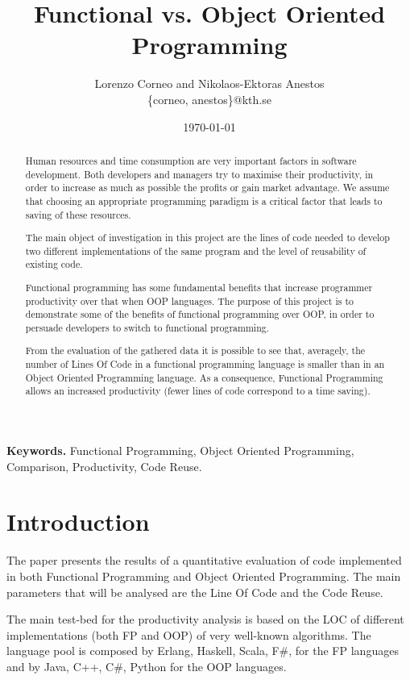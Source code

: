 \documentclass{article}
\begin{document}
\title{Functional vs. Object Oriented Programming}
\author{Lorenzo Corneo and Nikolaos-Ektoras Anestos \\
	\{corneo, anestos\}@kth.se}
\date{\today}
\maketitle

\begin{abstract}
Human resources and time consumption are very important factors in software development. Both developers and managers try to maximise their productivity, in order to increase as much as possible the profits or gain market advantage. We assume that choosing an appropriate programming paradigm is a critical factor that leads to saving of these resources.

The main object of investigation in this project are the lines of code needed to develop two different implementations of the same program and the level of reusability of existing code.

Functional programming has some fundamental benefits that increase programmer productivity over that when OOP languages. The purpose of this project is to demonstrate some of the benefits of functional programming over OOP, in order to persuade developers to switch to functional programming.

From the evaluation of the gathered data it is possible to see that, averagely, the number of Lines Of Code in a functional programming language is smaller than in an Object Oriented Programming language. As a consequence, Functional Programming allows an increased productivity (fewer lines of code correspond to a time saving).
\end{abstract}

\smallskip
\noindent \textbf{Keywords.} Functional Programming, Object Oriented Programming, Comparison, Productivity, Code Reuse.

\section{Introduction}

The paper presents the results of a quantitative evaluation of code implemented in both Functional Programming and Object Oriented Programming. The main parameters that will be analysed are the Line Of Code and the Code Reuse.

The main test-bed for the productivity analysis is based on the LOC of different implementations (both FP and OOP) of very well-known algorithms. The language pool is composed by Erlang, Haskell, Scala, F\#, for the FP languages and by Java, C++, C\#, Python for the OOP languages.
\end{document}
